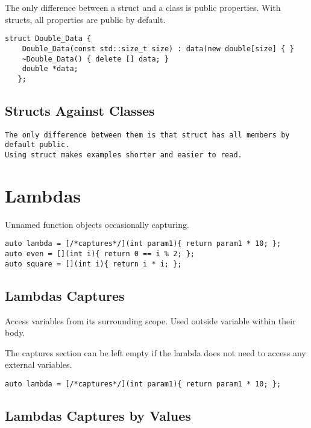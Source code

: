 The only difference between a struct and a class is public properties. With
structs, all properties are public by default.

\begin{verbatim}
struct Double_Data {
    Double_Data(const std::size_t size) : data(new double[size] { }
    ~Double_Data() { delete [] data; }
    double *data;
   };
\end{verbatim}

\subsection{Structs Against Classes}

\begin{verbatim}
The only difference between them is that struct has all members by default public.
Using struct makes examples shorter and easier to read. 
\end{verbatim}

\section{Lambdas}

Unnamed function objects occasionally capturing.

\begin{verbatim}
auto lambda = [/*captures*/](int param1){ return param1 * 10; };
auto even = [](int i){ return 0 == i % 2; };
auto square = [](int i){ return i * i; }; 
\end{verbatim}

\subsection{Lambdas Captures}

Access variables from its surrounding scope.
Used outside variable within their body.

The captures section can be left empty if
the lambda does not need to access any external variables.

\begin{verbatim}
auto lambda = [/*captures*/](int param1){ return param1 * 10; };
\end{verbatim}

\subsection{Lambdas Captures by Values}

